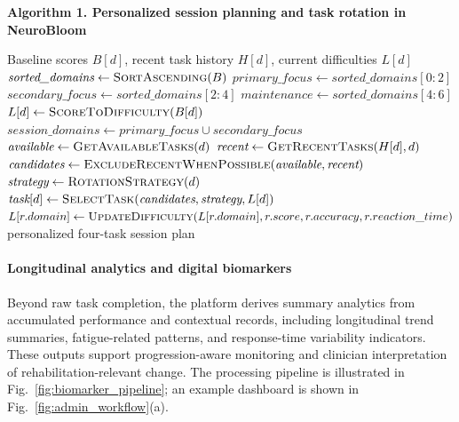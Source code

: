 \documentclass[preprint,12pt,a4paper]{elsarticle}
\begin{document}
\begin{center}
\begin{minipage}{0.92\linewidth}
\small
\textbf{Algorithm 1. Personalized session planning and task rotation in NeuroBloom}
\begin{algorithmic}[1]
\Require Baseline scores $B[d]$, recent task history $H[d]$, current difficulties $L[d]$
\State $\textit{sorted\_domains} \gets \Call{SortAscending}{B}$
\State $\textit{primary\_focus} \gets \textit{sorted\_domains}[0:2]$
\State $\textit{secondary\_focus} \gets \textit{sorted\_domains}[2:4]$
\State $\textit{maintenance} \gets \textit{sorted\_domains}[4:6]$
    \State $L[d] \gets \Call{ScoreToDifficulty}{B[d]}$
\EndFor
\State $\textit{session\_domains} \gets \textit{primary\_focus} \cup \textit{secondary\_focus}$
    \State $\textit{available} \gets \Call{GetAvailableTasks}{d}$
    \State $\textit{recent} \gets \Call{GetRecentTasks}{H[d], d}$
    \State $\textit{candidates} \gets \Call{ExcludeRecentWhenPossible}{\textit{available}, \textit{recent}}$
    \State $\textit{strategy} \gets \Call{RotationStrategy}{d}$
    \State $\textit{task}[d] \gets \Call{SelectTask}{\textit{candidates}, \textit{strategy}, L[d]}$
\EndFor
{}
    \State {}
    \State $L[r.domain] \gets \Call{UpdateDifficulty}{L[r.domain], r.score, r.accuracy, r.reaction\_time}$
\EndFor
{}
    \State {}
\EndIf
\State \Return personalized four-task session plan
\end{algorithmic}
\end{minipage}
\end{center}

\paragraph{Longitudinal analytics and digital biomarkers}
Beyond raw task completion, the platform derives summary analytics from accumulated performance and contextual records, including longitudinal trend summaries, fatigue-related patterns, and response-time variability indicators. These outputs support progression-aware monitoring and clinician interpretation of rehabilitation-relevant change. The processing pipeline is illustrated in Fig.~\ref{fig:biomarker_pipeline}; an example dashboard is shown in Fig.~\ref{fig:admin_workflow}(a).
\end{document}
